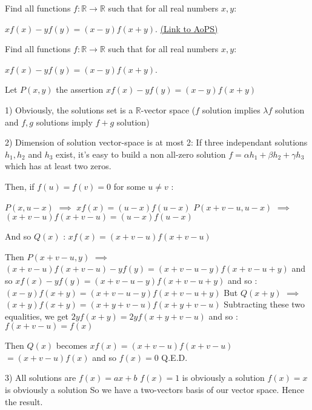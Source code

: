 \begin{problem}
	Find all functions $ f: \mathbb{R} \rightarrow \mathbb{R}$ such that for all real numbers $ x,y$:

$ x f(x)-yf(y)=(x-y)f(x+y)$.
	\flushright \href{https://artofproblemsolving.com/community/c6h286211}{(Link to AoPS)}
\end{problem}



\begin{solution}
	\begin{tcolorbox}Find all functions $ f: \mathbb{R} \rightarrow \mathbb{R}$ such that for all real numbers $ x,y$:

$ x f(x) - yf(y) = (x - y)f(x + y)$.\end{tcolorbox}

Let $ P(x,y)$ the assertion $ xf(x)-yf(y)=(x-y)f(x+y)$

1) Obviously, the solutions set is a $ \mathbb R$-vector space ($ f$ solution implies $ \lambda f$ solution and $ f,g$ solutions imply $ f+g$ solution)

2) Dimension of solution vector-space is at most 2:
If three independant solutions $ h_1,h_2$ and $ h_3$ exist, it's easy to build a non all-zero solution $ f=\alpha h_1+\beta h_2+\gamma h_3$ which has at least two zeros.

Then, if $ f(u)=f(v)=0$ for some $ u\neq v$ :

$ P(x,u-x)$ $ \implies$ $ xf(x)=(u-x)f(u-x)$
$ P(x+v-u,u-x)$ $ \implies$ $ (x+v-u)f(x+v-u)=(u-x)f(u-x)$

And so $ Q(x)$ : $ xf(x)=(x+v-u)f(x+v-u)$

Then $ P(x+v-u,y)$ $ \implies$ $ (x+v-u)f(x+v-u)-yf(y)=(x+v-u-y)f(x+v-u+y)$ and so $ xf(x)-yf(y)=(x+v-u-y)f(x+v-u+y)$ and so :
$ (x-y)f(x+y)=(x+v-u-y)f(x+v-u+y)$
But $ Q(x+y)$ $ \implies$ $ (x+y)f(x+y)=(x+y+v-u)f(x+y+v-u)$ 
Subtracting these two equalities, we get $ 2yf(x+y)=2yf(x+y+v-u)$ and so : $ f(x+v-u)=f(x)$

Then $ Q(x)$ becomes $ xf(x)=(x+v-u)f(x+v-u)$ $ =(x+v-u)f(x)$ and so $ f(x)=0$
Q.E.D.

3) All solutions are $ f(x)=ax+b$
$ f(x)=1$ is obviously a solution
$ f(x)=x$ is obviously a solution
So we have a two-vectors basis of our vector space.
Hence the result.
\end{solution}



